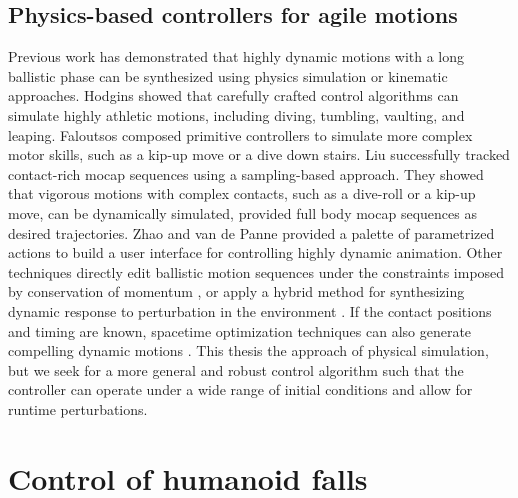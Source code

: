 \subsection{Physics-based controllers for agile motions}
Previous work has demonstrated that highly
dynamic motions with a long ballistic phase can be synthesized using
physics simulation or kinematic approaches. Hodgins \etal
\cite{Hodgins:1995:AHA,Wooten:1998:Phd} showed that carefully
crafted control algorithms can simulate highly athletic motions,
including diving, tumbling, vaulting, and leaping. Faloutsos \etal
\cite{Faloutsos:2001:CCF} composed primitive controllers to
simulate more complex motor skills, such as a kip-up move or a dive
down stairs. Liu \etal \cite{Liu:2010:SCM} successfully tracked
contact-rich mocap sequences using a sampling-based approach. They
showed that vigorous motions with complex contacts, such as a
dive-roll or a kip-up move, can be dynamically simulated, provided
full body mocap sequences as desired trajectories. Zhao and van de
Panne \cite{Zhao:2005:UII} provided a palette of parametrized
actions to build a user interface for controlling highly dynamic
animation.  Other techniques directly edit ballistic motion sequences
under the constraints imposed by conservation of momentum
\cite{Majkowska:2007:FPM,Sok:2010:EDH}, or apply a hybrid method for
synthesizing dynamic response to perturbation in the environment
\cite{Shapiro:2003:HCI}.  If the contact positions and timing are
known, spacetime optimization techniques can also generate compelling
dynamic motions
\cite{Liu:2002:SCD,Fang:2003:ESP,Safonova:2004:SPR,Sulejmanpavic:2004:APB}.
This thesis the approach of physical simulation, 
but we seek for a more general and robust control algorithm such that the
controller can operate under a wide range of initial conditions and
allow for runtime perturbations. 



\section{Control of humanoid falls}
\label{sec:related_falling}

